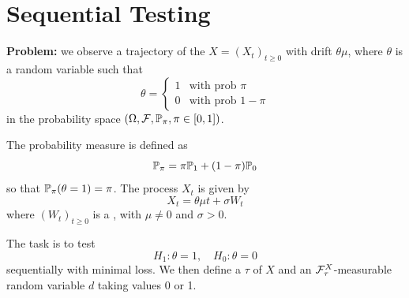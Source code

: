 \section{Sequential Testing}

\begin{remark}
    \textbf{Problem:} we observe a trajectory of the  $X = (X_t)_{t \geq 0}$ with drift $\theta \mu$, where $\theta$ is a random variable such that
    \[ \theta = \begin{cases} 1 & \text{with prob } \pi \\ 0 & \text{with prob } 1-\pi \end{cases} \]
    in the probability space $(\Omega, \mathcal{F}, \mathbb P_\pi, \pi \in [0,1])$.
    
    The probability measure is defined as
    \[ \mathbb P_\pi = \pi \mathbb P_1 + (1-\pi) \mathbb P_0 \]
    so that $\mathbb P_\pi(\theta = 1) = \pi$. The process $X_t$ is given by
    \[ X_t = \theta \mu t + \sigma W_t \]
    where $(W_t)_{t \geq 0}$ is a , with $\mu \neq 0$ and $\sigma > 0$.
    
    The task is to test
    \[ H_1 : \theta = 1, \quad H_0 : \theta = 0 \]
    sequentially with minimal loss. We then define a  $\tau$ of $X$ and an $\mathcal{F}_\tau^X$-measurable random variable $d$ taking values 0 or 1.
\end{remark}